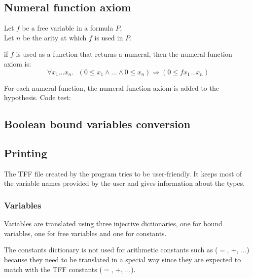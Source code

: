 \documentclass[a4paper, 11pt]{article}
\theoremstyle{plain}
\theoremstyle{definition}
\theoremstyle{remark}
\begin{document}
\subsection{Numeral function axiom}
Let $f$ be a free variable in a formula $P$, 
\\Let $n$ be the arity at which $f$ is used in $P$.

if $f$ is used as a function that returns a numeral, then the numeral function axiom is:
  \[ \forall x_1 \ldots x_n.\mbox{ } ( 0 \leq x_1 \wedge \ldots \wedge 0 \leq x_n) \Rightarrow (0 \leq f x_1 \ldots x_n)
  \]  

For each numeral function, the numeral function axiom is added to the hypothesis. 
Code test:
\subsection{Boolean bound variables conversion} 

\subsection{Printing}
The TFF file created by the program tries to be user-friendly. It keeps most of the variable names provided by the user and gives information about the types.

\subsubsection{Variables}
Variables are translated using three injective dictionaries, one for bound variables, one for free variables and one for constants.

The constants dictionary is not used for arithmetic constants such as ($=$, $+$, ...) because they need to be translated in a special way since they are expected to match with the TFF constants ($=$, $+$, ...).
\end{document}
